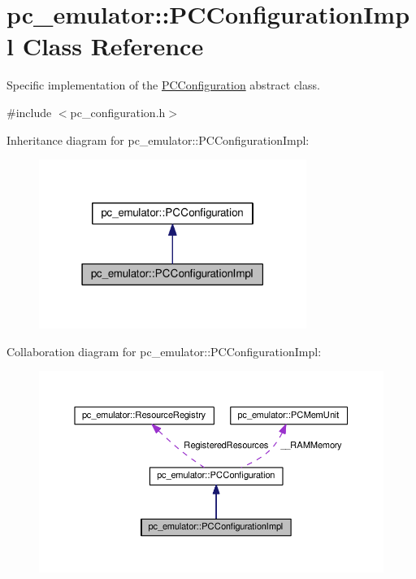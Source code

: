 \hypertarget{classpc__emulator_1_1PCConfigurationImpl}{}\section{pc\+\_\+emulator\+:\+:P\+C\+Configuration\+Impl Class Reference}
\label{classpc__emulator_1_1PCConfigurationImpl}


Specific implementation of the \hyperlink{classpc__emulator_1_1PCConfiguration}{P\+C\+Configuration} abstract class.  




{\ttfamily \#include $<$pc\+\_\+configuration.\+h$>$}



Inheritance diagram for pc\+\_\+emulator\+:\+:P\+C\+Configuration\+Impl\+:\nopagebreak
\begin{figure}[H]
\begin{center}
\leavevmode
\includegraphics[width=247pt]{classpc__emulator_1_1PCConfigurationImpl__inherit__graph}
\end{center}
\end{figure}


Collaboration diagram for pc\+\_\+emulator\+:\+:P\+C\+Configuration\+Impl\+:\nopagebreak
\begin{figure}[H]
\begin{center}
\leavevmode
\includegraphics[width=350pt]{classpc__emulator_1_1PCConfigurationImpl__coll__graph}
\end{center}
\end{figure}
